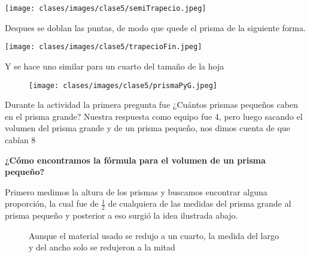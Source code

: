 \begin{center}
    \texttt{[image: clases/images/clase5/semiTrapecio.jpeg]}
\end{center}

Despues se doblan las puntas, de modo que quede el prisma de la siguiente forma.

\begin{center}
    \texttt{[image: clases/images/clase5/trapecioFin.jpeg]}
\end{center}

Y se hace uno similar para un cuarto del tamaño de la hoja
\begin{figure}[ht!]
    \begin{center}
        \texttt{[image: clases/images/clase5/prismaPyG.jpeg]}
    \end{center}
\end{figure}

Durante la actividad la primera pregunta fue ¿Cuántos prismas pequeños caben en el prisma grande? Nuestra respuesta como equipo fue 4, pero luego sacando el volumen del prisma grande y de un prisma pequeño, nos dimos cuenta de que cabían 8

\textbf{¿Cómo encontramos la fórmula para el volumen de un prisma pequeño?}

Primero medimos la altura de los prismas y buscamos encontrar alguna proporción, la cual fue de $\frac{1}{2}$ de cualquiera de las medidas del prisma grande al prisma pequeño y posterior a eso surgió la idea ilustrada abajo. 

\begin{figure}[ht!]
    \begin{center}
    \end{center}
    \caption{Aunque el material usado se redujo a un cuarto, la medida del largo y del ancho solo se redujeron a la mitad}
\end{figure}

